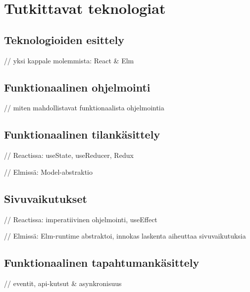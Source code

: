 \chapter{Tutkittavat teknologiat}

\section{Teknologioiden esittely}

// yksi kappale molemmista: React \& Elm

\section{Funktionaalinen ohjelmointi}

// miten mahdollistavat funktionaalista ohjelmointia

\section{Funktionaalinen tilankäsittely}

// Reactissa: useState, useReducer, Redux

// Elmissä: Model-abstraktio

\section{Sivuvaikutukset}

// Reactissa: imperatiivinen ohjelmointi, useEffect

// Elmissä: Elm-runtime abstraktoi, innokas laskenta aiheuttaa sivuvaikutuksia

\section{Funktionaalinen tapahtumankäsittely}

// eventit, api-kutsut \& asynkronisuus
